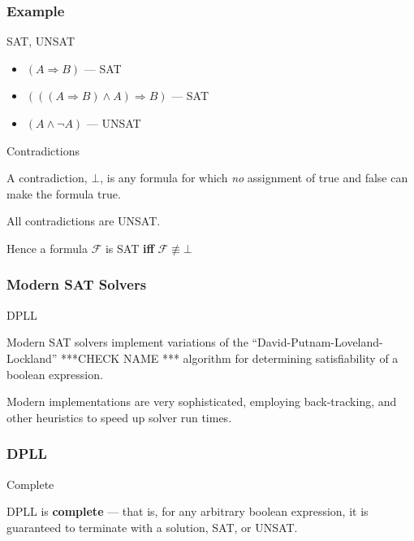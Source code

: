 \documentclass{beamer}
\begin{document}
\begin{frame}
\frametitle{Example}
\begin{exampleblock}
{SAT, UNSAT} 

\begin{itemize}
\item \((A \Rightarrow B)\) --- SAT
\item \((((A \Rightarrow B) \land A) \Rightarrow B)\) --- SAT
\item \((A \land \neg A)\) --- UNSAT
\end{itemize}
\end{exampleblock}

\begin{alertblock}
{Contradictions}

A contradiction, \(\bot\), is any formula for which \emph{no} assignment of true and false can make the formula true.

All contradictions are UNSAT.  

Hence a formula \(\mathcal{F}\) is SAT \textbf{iff} \(\mathcal{F} \not \equiv \bot\) 
\end{alertblock}

\end{frame}

\begin{frame}
\frametitle{Modern SAT Solvers}
\begin{block}
{DPLL} 

Modern SAT solvers implement variations of the ``David-Putnam-Loveland-Lockland'' ***CHECK NAME *** algorithm for determining satisfiability of a boolean expression.

Modern implementations are very sophisticated, employing back-tracking, and other heuristics to speed up solver run times.

\end{block}
\end{frame}

\begin{frame}
\frametitle{DPLL}
\begin{alertblock}
{Complete} 

DPLL is \textbf{complete} --- that is, for any arbitrary boolean expression, it is guaranteed to terminate with a solution, SAT, or UNSAT.

\end{alertblock}
\end{frame}
\end{document}
